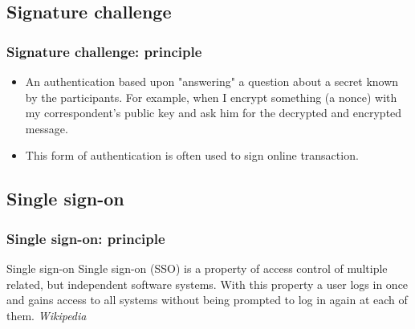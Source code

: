 
\subsection{Signature challenge}

\begin{frame}
\frametitle{Signature challenge: principle}

\begin{itemize}
\item An authentication based upon "answering" a question about a secret
known by the participants. For example, when I encrypt something (a nonce)
with my correspondent's public key and ask him for the decrypted and encrypted
message.

\item This form of authentication is often used to sign online
  transaction.
\end{itemize}

\end{frame}

\subsection{Single sign-on}

\begin{frame}
\frametitle{Single sign-on: principle}

\begin{block}{Single sign-on}
Single sign-on (SSO) is a property of access control of multiple
related, but independent software systems. With this property a user
logs in once and gains access to all systems without being prompted to
log in again at each of them. \textit{Wikipedia}
\end{block}

\end{frame}

